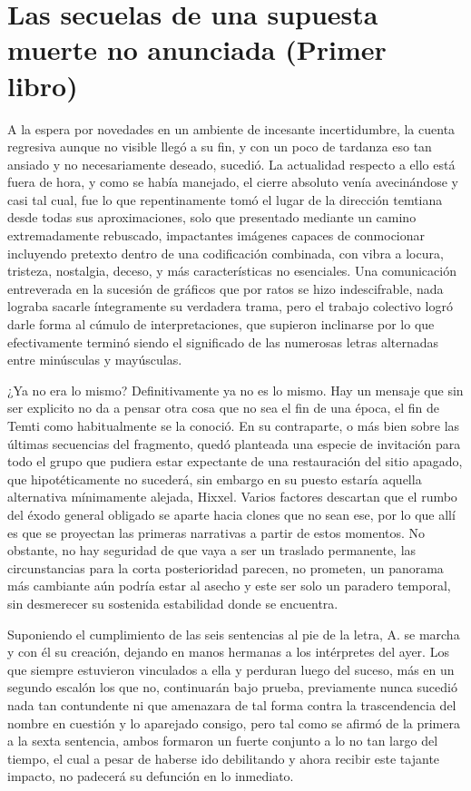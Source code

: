 \documentclass[
]{book}
\begin{document}
\hypertarget{las-secuelas-de-una-supuesta-muerte-no-anunciada-primer-libro}{%
\chapter{Las secuelas de una supuesta muerte no anunciada (Primer libro)}\label{las-secuelas-de-una-supuesta-muerte-no-anunciada-primer-libro}}

A la espera por novedades en un ambiente de incesante incertidumbre, la cuenta regresiva aunque no visible llegó a su fin, y con un poco de tardanza eso tan ansiado y no necesariamente deseado, sucedió. La actualidad respecto a ello está fuera de hora, y como se había manejado, el cierre absoluto venía avecinándose y casi tal cual, fue lo que repentinamente tomó el lugar de la dirección temtiana desde todas sus aproximaciones, solo que presentado mediante un camino extremadamente rebuscado, impactantes imágenes capaces de conmocionar incluyendo pretexto dentro de una codificación combinada, con vibra a locura, tristeza, nostalgia, deceso, y más características no esenciales. Una comunicación entreverada en la sucesión de gráficos que por ratos se hizo indescifrable, nada lograba sacarle íntegramente su verdadera trama, pero el trabajo colectivo logró darle forma al cúmulo de interpretaciones, que supieron inclinarse por lo que efectivamente terminó siendo el significado de las numerosas letras alternadas entre minúsculas y mayúsculas.

¿Ya no era lo mismo? Definitivamente ya no es lo mismo. Hay un mensaje que sin ser explicito no da a pensar otra cosa que no sea el fin de una época, el fin de Temti como habitualmente se la conoció. En su contraparte, o más bien sobre las últimas secuencias del fragmento, quedó planteada una especie de invitación para todo el grupo que pudiera estar expectante de una restauración del sitio apagado, que hipotéticamente no sucederá, sin embargo en su puesto estaría aquella alternativa mínimamente alejada, Hixxel. Varios factores descartan que el rumbo del éxodo general obligado se aparte hacia clones que no sean ese, por lo que allí es que se proyectan las primeras narrativas a partir de estos momentos. No obstante, no hay seguridad de que vaya a ser un traslado permanente, las circunstancias para la corta posterioridad parecen, no prometen, un panorama más cambiante aún podría estar al asecho y este ser solo un paradero temporal, sin desmerecer su sostenida estabilidad donde se encuentra.

Suponiendo el cumplimiento de las seis sentencias al pie de la letra, A. se marcha y con él su creación, dejando en manos hermanas a los intérpretes del ayer. Los que siempre estuvieron vinculados a ella y perduran luego del suceso, más en un segundo escalón los que no, continuarán bajo prueba, previamente nunca sucedió nada tan contundente ni que amenazara de tal forma contra la trascendencia del nombre en cuestión y lo aparejado consigo, pero tal como se afirmó de la primera a la sexta sentencia, ambos formaron un fuerte conjunto a lo no tan largo del tiempo, el cual a pesar de haberse ido debilitando y ahora recibir este tajante impacto, no padecerá su defunción en lo inmediato.
\end{document}
